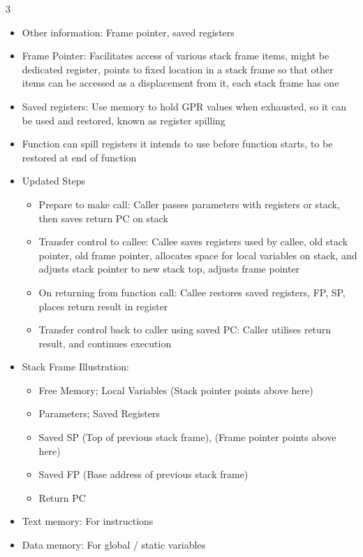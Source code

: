 \documentclass[10pt, landscape]{article}
\begin{document}
\begin{multicols*}{3}
\begin{itemize}
\begin{itemize}
        \item Transfer control back to caller using saved PC: Caller utilises return result, and continues execution
    \end{itemize}
    \item Other information: Frame pointer, saved registers
    \item Frame Pointer: Facilitates access of various stack frame items, might be dedicated register, points to fixed location in a stack frame so that other items can be accessed as a displacement from it, each stack frame has one
    \item Saved registers: Use memory to hold GPR values when exhausted, so it can be used and restored, known as register spilling
    \item Function can spill registers it intends to use before function starts, to be restored at end of function
    \item Updated Steps
    \begin{itemize}
        \item Prepare to make call: Caller passes parameters with registers or stack, then saves return PC on stack
        \item Transfer control to callee: Callee saves registers used by callee, old stack pointer, old frame pointer, allocates space for local variables on stack, and adjusts stack pointer to new stack top, adjusts frame pointer
        \item On returning from function call: Callee restores saved registers, FP, SP, places return result in register
        \item Transfer control back to caller using saved PC: Caller utilises return result, and continues execution
    \end{itemize}
    \item Stack Frame Illustration:
    \begin{itemize}
        \item Free Memory; Local Variables (Stack pointer points above here)
        \item Parameters; Saved Registers
        \item Saved SP (Top of previous stack frame), (Frame pointer points above here)
        \item Saved FP (Base address of previous stack frame)
        \item Return PC
    \end{itemize}
    \item Text memory: For instructions
    \item Data memory: For global / static variables
\end{itemize}


\end{multicols*}
\end{document}
